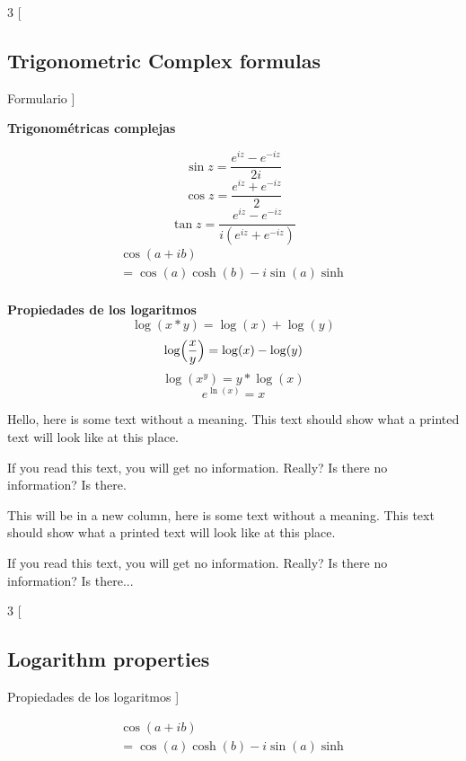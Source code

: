 \begin{multicols*}{3}
    [
        \subsection{Trigonometric Complex formulas}
        Formulario
    ]
    
    \textbf{Trigonométricas complejas}
    
    \[ \sin{z} = \frac{e^{iz} - e^{-iz}}{2i} \]
    \hrulefill
    \[ \cos{z} = \frac{e^{iz} + e^{-iz}}{2} \]
    \hrulefill
    \[ \tan{z} = \frac{e^{iz} - e^{-iz}}{i(e^{iz} + e^{-iz})} \]
    \hrulefill
    \begin{gather*}
        \cos \left(a+ib\right)\\
        = \cos \left(a\right)\cosh \left(b\right)-i\sin \left(a\right)\sinh
    \end{gather*}
    \hrulefill \newline \\

    \textbf{Propiedades de los logaritmos}
    \[ \log(x * y) = \log(x) + \log(y) \]
    \hrulefill
    \[ \log\Bigl( \frac{x}{y} \Bigr) = \log(x) - \log(y) \]
    \hrulefill
    \[ \log(x^y) = y * \log(x) \]
    \hrulefill
    \[ e^{\ln(x)} = x \]
    \hrulefill
    \columnbreak

    Hello, here is some text without a meaning.  This text should show what 
    a printed text will look like at this place.
    
    If you read this text, you will get no information.  Really?  Is there 
    no information?  Is there.
    
    This will be in a new column, here is some text without a meaning.  This text 
    should show what a printed text will look like at this place.
    
    If you read this text, you will get no information.  Really?  Is there 
    no information?  Is there...
\end{multicols*}


\begin{multicols}{3}
    [
        \subsection{Logarithm properties}
        Propiedades de los logaritmos
    ]

    
    \hrulefill
    
    \hrulefill
    \begin{gather*}
        \cos \left(a+ib\right)\\
        = \cos \left(a\right)\cosh \left(b\right)-i\sin \left(a\right)\sinh
    \end{gather*}
    \hrulefill
\end{multicols}
 
\newpage